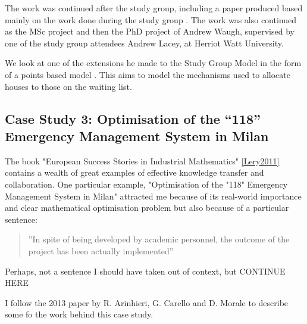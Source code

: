 \documentclass[11pt]{article} %
\begin{document}
	The work was continued after the study group, including a paper produced based mainly on the work done during the study group \cite{Byatt-Smith2003}. The work was also continued as the MSc project and then the PhD project of Andrew Waugh, supervised by one of the study group attendees Andrew Lacey, at Herriot Watt University. 
	
	We look at one of the extensions he made to the Study Group Model in the form of a points based model \cite{Waugh1999}. This aims to model the mechanisms used to allocate houses to those on the waiting list. 
	
	
	
	\subsection{Case Study 3: Optimisation of the “118” Emergency Management System in Milan  }
	The book "European Success Stories in Industrial Mathematics" \ref{Lery2011} contains a wealth of great examples of effective knowledge transfer and collaboration. One particular example, "Optimisation of the "118" Emergency Management System in Milan" attracted me because of its real-world importance and clear mathematical optimisation problem but also because of a particular sentence: 
	
	\begin{quote}
		''In spite of being developed by academic personnel, the outcome of the project has been actually implemented''
	\end{quote}

	Perhaps, not a sentence I should have taken out of context, but CONTINUE HERE 
	
	

	I follow the 2013 paper by R. Arinhieri, G. Carello and D. Morale \cite{R.AringhieriG.Carello2013}  to describe some fo the work behind this case study.
	
\end{document}
